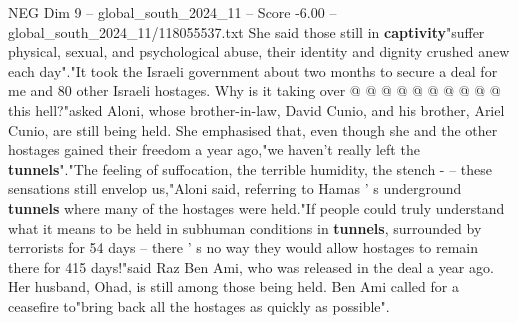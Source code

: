 \begin{textsample}{NEG Dim 9 – global\_south\_2024\_11 – Score -6.00 – global\_south\_2024\_11/118055537.txt}
She said those still in \textbf{captivity}"suffer physical, sexual, and psychological abuse, their identity and dignity crushed anew each day"."It took the Israeli government about two months to secure a deal for me and 80 other Israeli hostages.
Why is it taking over @ @ @ @ @ @ @ @ @ @ this hell?"asked Aloni, whose brother-in-law, David Cunio, and his brother, Ariel Cunio, are still being held.
She emphasised that, even though she and the other hostages gained their freedom a year ago,"we haven't really left the \textbf{tunnels}"."The feeling of suffocation, the terrible humidity, the stench - -- these sensations still envelop us,"Aloni said, referring to Hamas ' s underground \textbf{tunnels} where many of the hostages were held."If people could truly understand what it means to be held in subhuman conditions in \textbf{tunnels}, surrounded by terrorists for 54 days -- there ' s no way they would allow hostages to remain there for 415 days!"said Raz Ben Ami, who was released in the deal a year ago.
Her husband, Ohad, is still among those being held.
Ben Ami called for a ceasefire to"bring back all the hostages as quickly as possible".

\end{textsample}
